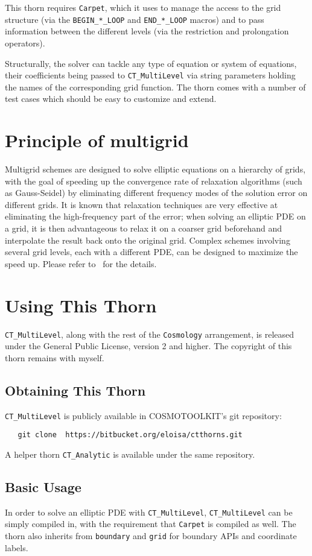 This thorn requires \texttt{Carpet}, which it uses to manage the 
access to the grid structure (via the \texttt{BEGIN\_*\_LOOP} and 
\texttt{END\_*\_LOOP} macros) and to pass information between the 
different levels (via the restriction and prolongation operators).

Structurally, the solver can tackle any type of equation or system
of equations, their coefficients being passed to \texttt{CT\_MultiLevel} 
via string parameters holding the names of the corresponding grid 
function. The thorn comes with a number of test cases which should 
be easy to customize and extend.

\section{Principle of multigrid}
Multigrid schemes are designed to solve elliptic equations on a 
hierarchy of grids, with the goal of speeding up the convergence 
rate of relaxation algorithms (such as Gauss-Seidel) by eliminating
different frequency modes of the solution error on different grids.
It is known that relaxation techniques are very effective at 
eliminating the high-frequency part of the error; when solving an 
elliptic PDE on a grid, it is then advantageous to relax it on a 
coarser grid beforehand and interpolate the result back onto the
original grid. Complex schemes involving several grid levels, each
with a different PDE, can be designed to maximize the speed up.
Please refer to~\cite{Briggs:2000fk} for the details.

\section{Using This Thorn}
\texttt{CT\_MultiLevel}, along with the rest of the \texttt{Cosmology}
arrangement, is released under the General Public License, version 2
and higher. The copyright of this thorn remains with myself.

\subsection{Obtaining This Thorn}
\texttt{CT\_MultiLevel} is publicly available in COSMOTOOLKIT's git 
repository:
\begin{verbatim}
   git clone  https://bitbucket.org/eloisa/ctthorns.git
\end{verbatim}
A helper thorn \texttt{CT\_Analytic} is available under the same repository.

\subsection{Basic Usage}
In order to solve an elliptic PDE with \texttt{CT\_MultiLevel},
\texttt{CT\_MultiLevel} can be simply compiled in, with the 
requirement that \texttt{Carpet} is compiled as well. The thorn 
also inherits from \texttt{boundary} and \texttt{grid} for boundary 
APIs and coordinate labels.

